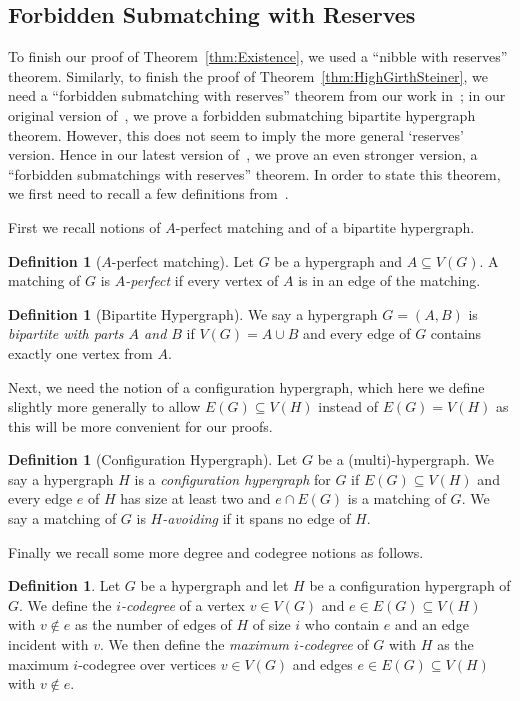 \documentclass[11pt]{article}
\newcounter{i}
\theoremstyle{plain}
\theoremstyle{plain} %
\theoremstyle{definition}
\newtheorem{definition}[thm]{Definition}
\newcommand{\LP}[1]{\textcolor{Red}{ $\blacktriangleright$\ {\sf LP: #1}\
  $\blacktriangleleft$ }}
\begin{document}
\subsection{Forbidden Submatching with Reserves}\label{ss:ForbiddenSubmatching}

To finish our proof of Theorem~\ref{thm:Existence}, we used a ``nibble with reserves'' theorem. Similarly, to finish the proof of Theorem~\ref{thm:HighGirthSteiner}, we need a ``forbidden submatching with reserves'' theorem from our work in~\cite{DP22}; in our original version of~\cite{DP22}, we prove a forbidden submatching bipartite hypergraph theorem. However, this does not seem to imply the more general `reserves' version. Hence in our latest version of~\cite{DP22}, we prove an even stronger version, a ``forbidden submatchings with reserves'' theorem. In order to state this theorem, we first need to recall a few definitions from~\cite{DP22}. 

First we recall notions of $A$-perfect matching and of a bipartite hypergraph.

\begin{definition}[$A$-perfect matching]
Let $G$ be a hypergraph and $A\subseteq V(G)$. A matching of $G$ is \emph{$A$-perfect} if every vertex of $A$ is in an edge of the matching.
\end{definition}

\begin{definition}[Bipartite Hypergraph]
We say a hypergraph $G=(A,B)$ is \emph{bipartite with parts $A$ and $B$} if $V(G)=A\cup B$ and  every edge of $G$ contains exactly one vertex from $A$. 
\end{definition}

Next, we need the notion of a configuration hypergraph, which here we define slightly more generally to allow $E(G)\subseteq V(H)$ instead of $E(G)=V(H)$ as this will be more convenient for our proofs.

\begin{definition}[Configuration Hypergraph]
Let $G$ be a (multi)-hypergraph. We say a hypergraph $H$ is a \emph{configuration hypergraph} for $G$ if $E(G)\subseteq V(H)$ and every edge $e$ of $H$ has size at least two and $e\cap E(G)$ is a matching of $G$. We say a matching of $G$ is \emph{$H$-avoiding} if it spans no edge of $H$.
\end{definition}

Finally we recall some more degree and codegree notions as follows.


\begin{definition}
Let $G$ be a hypergraph and let $H$ be a configuration hypergraph of $G$. We define the \emph{$i$-codegree} of a vertex $v\in V(G)$ and $e\in E(G)\subseteq V(H)$ with $v\notin e$ as the number of edges of $H$ of size $i$ who contain $e$ and an edge incident with $v$. We then define the \emph{maximum $i$-codegree} of $G$ with $H$ as the maximum $i$-codegree over vertices $v\in V(G)$ and edges $e\in E(G)\subseteq V(H)$ with $v\notin e$. 
\end{definition}
\end{document}

